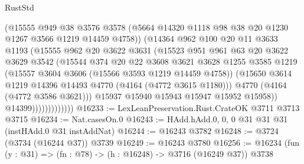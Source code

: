 \begin{lexlean}{RustStd}
\begin{coremodule}
                            (@15555
                              @949
                              @38
                              @3576
                              @3578
                              (@5664 @14320 @1118 @98 @38 @20 @1230 @1267 @3566 @1219 @14459 @4758))
                            (@14364
                              @962
                              @100
                              @20
                              @11
                              @3633
                              @1193
                              (@15555
                                @962
                                @20
                                @3622
                                @3631
                                (@15523
                                  @951
                                  @961
                                  @63
                                  @20
                                  @3622
                                  @3629
                                  @3542
                                  (@15544
                                    @374
                                    @20
                                    @22
                                    @3608
                                    @3621
                                    @3628
                                    @1255
                                    @3585
                                    @1219
                                    (@15557 @3604 @3606 (@15566 @3593 @1219 @14459 @4758))
                                    (@15650
                                      @3614
                                      @1219
                                      @14396
                                      @14493
                                      @4770
                                      (@4164 (@4772 @3615 @1180)))
                                    @4770
                                    (@4164 (@4772 @3586 @3621)))
                                  @15937
                                  @15940
                                  @15943
                                  @15947
                                  @15952
                                  @15958))
                              @14399)))))))))))))
@16233 := LexLeanPreservation.Rust.CrateOK @3711 @3713 @3715
@16234 := Nat.casesOn.{0}
@16243 := HAdd.hAdd.{0, 0, 0} @31 @31 @31 (instHAdd.{0} @31 instAddNat)
@16244 := @16243 @3782
@16248 := @3724 (@3734 (@16244 @37)) @3739
@16249 := @16243 @3780
@16256 := @16234 (fun (y : @31) => (fn : @78) -> (h : @16248) -> @3716 (@16249 @37)) @3738

\end{coremodule}
\end{lexlean}
